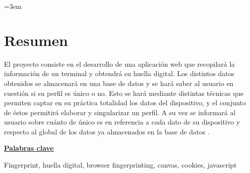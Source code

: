 \parindent=3em
\chapter{Resumen}

El proyecto consiste en el desarrollo de una aplicación web que recopilará la información de un terminal y obtendrá su huella digital. Los distintos datos obtenidos se almacenará en una base de datos y se hará saber al usuario en cuestión si su perfil es único o no. Esto se hará mediante distintas técnicas que permiten captar en su práctica totalidad los datos del dispositivo, y el conjunto de éstos permitirá elaborar y singularizar un perfil. A su vez se informará al usuario sobre cuánto de único es en referencia a cada dato de su dispositivo y respecto al global de los datos ya almacenados en la base de datos . \par
\vspace{12mm}
\noindent
\underline{\Large{\textbf{Palabras clave}}}\par
\vspace{7mm}
\noindent
\normalsize{Fingerprint, huella digital, browser fingerprinting, canvas, cookies, javascript}


















